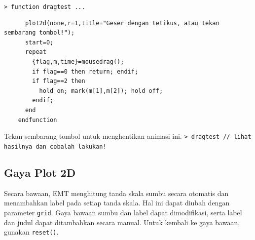 \documentclass[11pt, a4paper]{article}
\newcommand{\emtcmd}[1]{\noindent\texttt{\textcolor{emtcommand}{>}\ #1}\par\smallskip}
\begin{document}
\emtcmd{function dragtest ...}
\begin{verbatim}
      plot2d(none,r=1,title="Geser dengan tetikus, atau tekan sembarang tombol!");
      start=0;
      repeat
        {flag,m,time}=mousedrag();
        if flag==0 then return; endif;
        if flag==2 then
          hold on; mark(m[1],m[2]); hold off;
        endif;
      end
    endfunction
\end{verbatim}

Tekan sembarang tombol untuk menghentikan animasi ini.
\emtcmd{dragtest \textcolor{emtcomment}{// lihat hasilnya dan cobalah lakukan!}}

\subsection*{Gaya Plot 2D}

Secara bawaan, EMT menghitung tanda skala sumbu secara otomatis dan menambahkan label pada setiap tanda skala. Hal ini dapat diubah dengan parameter \texttt{grid}. Gaya bawaan sumbu dan label dapat dimodifikasi, serta label dan judul dapat ditambahkan secara manual. Untuk kembali ke gaya bawaan, gunakan \texttt{reset()}.
\end{document}
